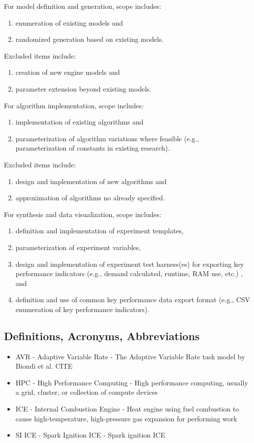 \documentclass[12pt,a4paper]{article}
\begin{document}
For model definition and generation, scope includes:
\begin{enumerate}
    \item enumeration of existing models and
    \item randomized generation based on existing models.
\end{enumerate}
Excluded items include:
\begin{enumerate}
    \item creation of new engine models and
    \item parameter extension beyond existing models.
\end{enumerate}

For algorithm implementation, scope includes:
\begin{enumerate}
    \item implementation of existing algorithms and
    \item parameterization of algorithm variations where feasible
    (e.g., parameterization of constants in existing research).
\end{enumerate}

Excluded items include:
\begin{enumerate}
    \item design and implementation of new algorithms and
    \item approximation of algorithms no already specified.
\end{enumerate}

For synthesis and data visualization, scope includes:
\begin{enumerate}
    \item definition and implementation of experiment templates,
    \item parameterization of experiment variables,
    \item design and implementation of experiment test harness(es) for exporting
    key performance indicators (e.g., demand calculated, runtime, RAM use, etc.)
    , and
    \item definition and use of common key performance data export format (e.g.,
    CSV enumeration of key performance indicators).
\end{enumerate}
\subsection{Definitions, Acronyms, Abbreviations}

\begin{itemize}
    \item AVR - Adaptive Variable Rate - The Adaptive Variable Rate task model by
    Biondi et al. CITE
    \item HPC - High Performance Computing - High performance computing, usually a
    grid, cluster, or collection of compute devices
    \item ICE - Internal Combustion Engine - Heat engine using fuel combustion 
    to cause high-temperature, high-pressure gas expansion for performing work
    \item SI ICE - Spark Ignition ICE - Spark ignition ICE
\end{itemize}
\end{document}
